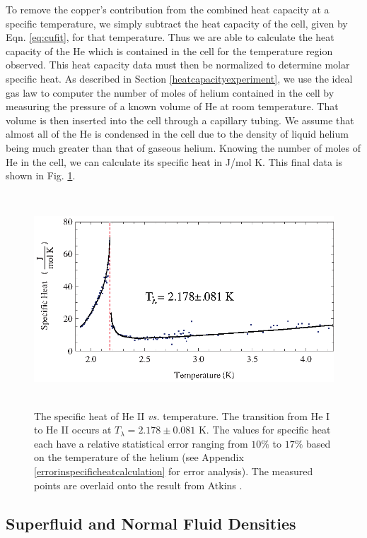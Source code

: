 To remove the copper's contribution from the combined heat capacity at a specific temperature, we simply subtract the heat capacity of the cell, given by Eqn. \ref{eq:cufit}, for that temperature. Thus we are able to calculate the heat capacity of the He which is contained in the cell for the temperature region observed.  This heat capacity data must then be normalized to determine molar specific heat. As described in Section \ref{heatcapacityexperiment}, we use the ideal gas law to computer the number of moles of helium contained in the cell by measuring the pressure of a known volume of He at room temperature. That volume is then inserted into the cell through a capillary tubing.  We assume that almost all of the He is condensed in the cell due to the density of liquid helium being much greater than that of gaseous helium.  Knowing the number of moles of He in the cell, we can calculate its specific heat in J/mol K. This final data is shown in Fig. \ref{fig:lambdatrans}.
\begin{figure}[htbp]
\begin{center}
\includegraphics[height=80mm]{./figures/lambdatrans.eps}
\caption{\small{The specific heat of He II \emph{vs.} temperature. The transition from He I to He II occurs at $T_{\lambda} = 2.178 \pm 0.081$ K.  The values for specific heat each have a relative statistical error ranging from $10\%$  to $17\%$ based on the temperature of the helium (see Appendix \ref{errorinspecificheatcalculation} for error analysis). The measured points are overlaid onto the result from Atkins \cite{atkins}.}}
\label{fig:lambdatrans}
\end{center}
\end{figure}

\subsection{Superfluid and Normal Fluid Densities}\label{superfluiddensity}

